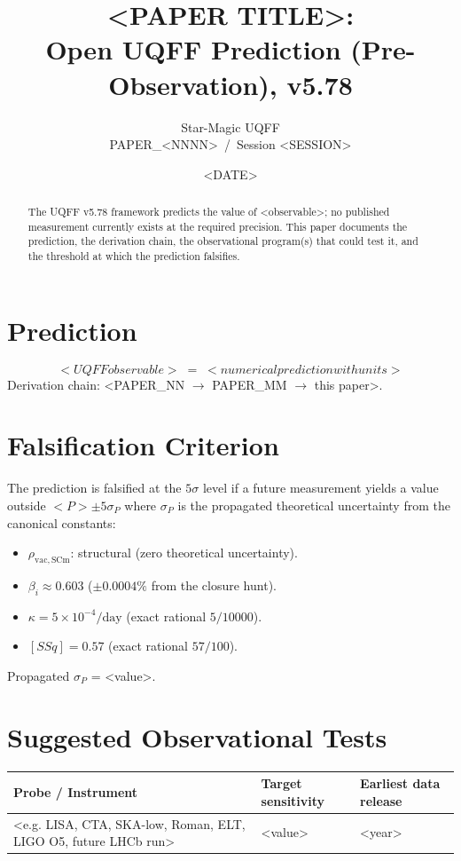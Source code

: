 \documentclass[11pt]{article}
\title{<PAPER TITLE>: \\ Open UQFF Prediction (Pre-Observation), v5.78}
\author{Star-Magic UQFF \\ PAPER\_<NNNN> \,/\, Session <SESSION>}
\date{<DATE>}
\begin{document}
\maketitle

\begin{abstract}
The UQFF v5.78 framework predicts the value of <observable>; no published
measurement currently exists at the required precision. This paper
documents the prediction, the derivation chain, the observational
program(s) that could test it, and the threshold at which the prediction
falsifies.
\end{abstract}

\section{Prediction}
\begin{equation}
  \boxed{\;<UQFF observable> \;=\; <numerical prediction with units>\;}
\end{equation}
Derivation chain: <PAPER\_NN $\to$ PAPER\_MM $\to$ this paper>.

\section{Falsification Criterion}
The prediction is falsified at the $5\sigma$ level if a future measurement
yields a value outside $<P>\pm 5\sigma_P$ where $\sigma_P$ is the propagated
theoretical uncertainty from the canonical constants:
\begin{itemize}
  \item $\rho_{\mathrm{vac,SCm}}$: structural (zero theoretical uncertainty).
  \item $\beta_i \approx 0.603$ ($\pm 0.0004\%$ from the closure hunt).
  \item $\kappa = 5\times 10^{-4}/\mathrm{day}$ (exact rational $5/10000$).
  \item $[SSq] = 0.57$ (exact rational $57/100$).
\end{itemize}
Propagated $\sigma_P$ = <value>.

\section{Suggested Observational Tests}
\begin{longtable}{lll}
\toprule
Probe / Instrument & Target sensitivity & Earliest data release \\
\midrule
<e.g. LISA, CTA, SKA-low, Roman, ELT, LIGO O5, future LHCb run> & <value> & <year> \\
\bottomrule
\end{longtable}
\end{document}
